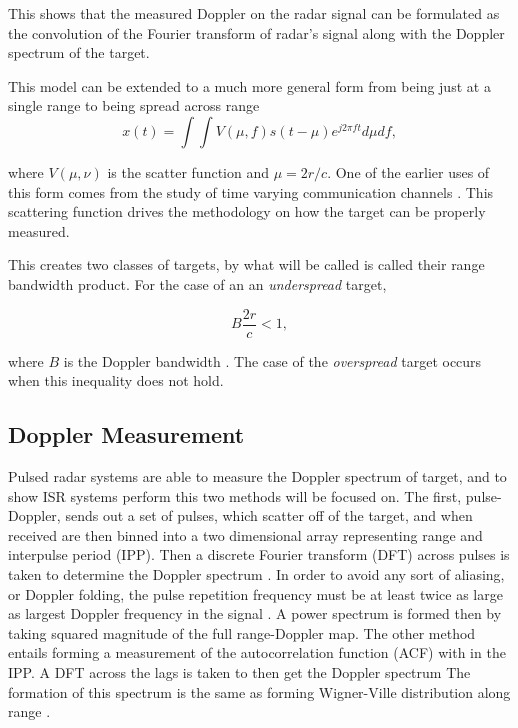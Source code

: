 \noindent This shows that the measured Doppler on the radar signal can be formulated as the convolution of the Fourier transform of radar's signal along with the Doppler spectrum of the target.


This model can be extended to a much more general form from being just at a single range to being spread across range
\begin{equation}
\label{eqn:scateqn}
x(t)= \int \int V(\mu,f)s(t-\mu)e^{j2\pi f t} d \mu df,
\end{equation}

\noindent where $V(\mu,\nu)$ is the scatter function and $\mu=2r/c$. One of the earlier uses of this form comes from the study of time varying communication channels \cite{Kailath:1962jx,Kailath:1963gh}. This scattering function drives the methodology on how the target can be properly measured. 

This creates two classes of targets, by what will be called is called their range bandwidth product. For the case of an an \textit{underspread} target,

\begin{equation}
\label{eqn:trp}
B\frac{2r}{c}<1,
\end{equation}

\noindent where $B$ is the Doppler bandwidth \cite{Pfander:2015ea}. The case of the \textit{overspread} target occurs when this inequality does not hold.
\subsection{Doppler Measurement}

Pulsed radar systems are able to measure the Doppler spectrum of target, and to show ISR systems perform this two methods will be focused on. The first, pulse-Doppler, sends out a set of pulses, which scatter off of the target, and when received are then binned into a two dimensional array representing range and interpulse period (IPP). Then a discrete Fourier transform (DFT) across pulses is taken to determine the Doppler spectrum \cite{richards2014fundamentals}. In order to avoid any sort of aliasing, or Doppler folding, the pulse repetition frequency must be at least twice as large as largest Doppler frequency in the signal \cite{dtsp:openhiem}. A power spectrum is formed then by taking squared magnitude of the full range-Doppler map. The other method entails forming a measurement of the autocorrelation function (ACF) with in the IPP. A DFT across the lags is taken to then get the Doppler spectrum The formation of this spectrum is the same as forming Wigner-Ville distribution along range \cite{TFAcohen}.

